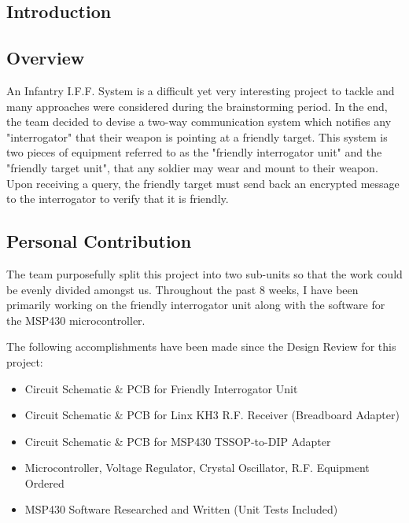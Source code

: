 \documentclass[letterpaper,10pt]{article}
\newcommand{\buildtoc}{
	\clearpage
	\singlespacing
	\tableofcontents
	\onehalfspacing
}
\begin{document}
\begin{spacing}{1.15}


\color{black}
\buildtoc
{}
\clearpage
\setcounter{page}{1}

\section{Introduction}
\subsection{Overview}
An Infantry I.F.F. System is a difficult yet very interesting project to tackle and many approaches were considered during the brainstorming period. In the end, the team decided to devise a two-way communication system which notifies any "interrogator" that their weapon is pointing at a friendly target. This system is two pieces of equipment referred to as the "friendly interrogator unit" and the "friendly target unit", that any soldier may wear and mount to their weapon. Upon receiving a query, the friendly target must send back an encrypted message to the interrogator to verify that it is friendly. 

\subsection{Personal Contribution}
The team purposefully split this project into two sub-units so that the work could be evenly divided amongst us. Throughout the past 8 weeks, I have been primarily working on the friendly interrogator unit along with the software for the MSP430 microcontroller. 

The following accomplishments have been made since the Design Review for this project:

\begin{itemize}
	\item Circuit Schematic \& PCB for Friendly Interrogator Unit
	\item Circuit Schematic \& PCB for Linx KH3 R.F. Receiver (Breadboard Adapter)
	\item Circuit Schematic \& PCB for MSP430 TSSOP-to-DIP Adapter
	\item Microcontroller, Voltage Regulator, Crystal Oscillator, R.F. Equipment Ordered
	\item MSP430 Software Researched and Written (Unit Tests Included)
\end{itemize}


\end{spacing}
\end{document}
